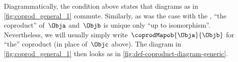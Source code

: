 \begin{remark}
    Diagrammatically, the condition above states that diagrams as in \cref{fig:coprod_general_1} commute.
    Similarly, as was the case with the , ``the coproduct'' of~$\Obja$ and~$\Objb$ is unique only ``up to isomorphism''.
    Nevertheless, we will usually simply write~$\coprodMapob{\Obja}{\Objb}$ for ``the'' coproduct (in place of~$\Objc$ above).
    The diagram in \cref{fig:coprod_general_1} then looks as in \cref{fig:def-coproduct-diagram-generic}.
\end{remark}

\begin{marginfigure}
    \centering
    \caption{}
    \label{fig:coprod_general_1}
    \label{fig:def-coproduct-diagram}
\end{marginfigure}

\begin{marginfigure}
    \centering
    \caption{}
    \label{fig:def-coproduct-diagram-generic}
\end{marginfigure}
%
%

%



